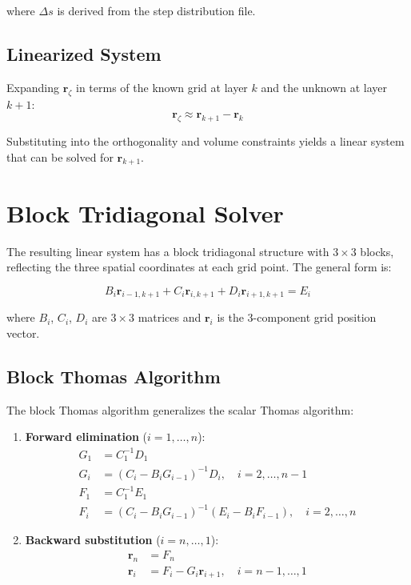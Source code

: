 \documentclass[11pt,a4paper]{report}
\newcommand{\rvec}{\bm{r}}
\begin{document}
where $\Delta s$ is derived from the step distribution file.

\subsection{Linearized System}

Expanding $\rvec_\zeta$ in terms of the known grid at layer $k$ and the unknown at layer $k+1$:
\begin{equation}
    \rvec_\zeta \approx \rvec_{k+1} - \rvec_k
\end{equation}

Substituting into the orthogonality and volume constraints yields a linear system that can be solved for $\rvec_{k+1}$.

\section{Block Tridiagonal Solver}

The resulting linear system has a block tridiagonal structure with $3 \times 3$ blocks, reflecting the three spatial coordinates at each grid point. The general form is:

\begin{equation}
    B_i \rvec_{i-1, k+1} + C_i \rvec_{i, k+1} + D_i \rvec_{i+1, k+1} = E_i
\end{equation}

where $B_i$, $C_i$, $D_i$ are $3 \times 3$ matrices and $\rvec_i$ is the 3-component grid position vector.

\subsection{Block Thomas Algorithm}

The block Thomas algorithm generalizes the scalar Thomas algorithm:

\begin{enumerate}
    \item \textbf{Forward elimination} ($i = 1, \dots, n$):
    \begin{align}
        G_1 &= C_1^{-1} D_1 \\
        G_i &= (C_i - B_i G_{i-1})^{-1} D_i, \quad i = 2,\dots,n-1 \\
        F_1 &= C_1^{-1} E_1 \\
        F_i &= (C_i - B_i G_{i-1})^{-1} (E_i - B_i F_{i-1}), \quad i = 2,\dots,n
    \end{align}

    \item \textbf{Backward substitution} ($i = n, \dots, 1$):
    \begin{align}
        \rvec_n &= F_n \\
        \rvec_i &= F_i - G_i \rvec_{i+1}, \quad i = n-1,\dots,1
    \end{align}
\end{enumerate}
\end{document}
